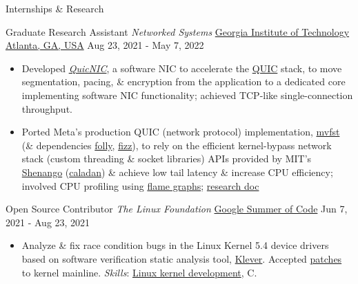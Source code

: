 \documentclass[]{mcdowellcv}
\begin{document}
\begin{cvsection}{Internships \& Research}
  \begin{cvsubsection}
    {Graduate Research Assistant \linebreak \textit{Networked Systems}}
    {\href{https://scs.gatech.edu/}{Georgia Institute of Technology \linebreak Atlanta, GA, USA}}
    {Aug 23, 2021 - May 7, 2022}
    \begin{itemize}
      \item
            Developed
            \href{https://github.com/saubhik/caladan/pulls}{\textit{QuicNIC}},
            a software NIC to accelerate the \href{https://quicwg.org/}{QUIC}
            stack, to move segmentation, pacing, \& encryption from the
            application to a dedicated core implementing software NIC
            functionality; achieved TCP-like single-connection throughput.
      \item
            Ported Meta's production QUIC (network protocol) implementation,
            \href{https://github.com/facebookincubator/mvfst}{mvfst} (\&
            dependencies \href{https://github.com/facebook/folly}{folly},
            \href{https://github.com/facebookincubator/fizz}{fizz}), to rely on
            the efficient kernel-bypass network stack (custom threading \&
            socket libraries) APIs provided by MIT's
            \href{https://www.usenix.org/conference/nsdi19/presentation/ousterhout}{Shenango}
            (\href{https://github.com/shenango/caladan}{caladan}) \& achieve low
            tail latency \& increase CPU efficiency; involved CPU profiling
            using
            \href{https://www.brendangregg.com/FlameGraphs/cpuflamegraphs.html}{flame
              graphs};
            \href{https://drive.google.com/file/d/1-y7gsG67KGIeD2qhomVT0vTPlPB4Vep1/view?usp=sharing}{research
              doc}
    \end{itemize}
  \end{cvsubsection}

  \begin{cvsubsection}
    {Open Source Contributor \linebreak \textit{The Linux Foundation}}
    {\href{https://summerofcode.withgoogle.com/archive/2021/projects/4818588170452992}{Google Summer of Code}}
    {Jun 7, 2021 - Aug 23, 2021}
    \begin{itemize}
      \item
            Analyze \& fix race condition bugs in the Linux Kernel 5.4 device
            drivers based on software verification static analysis tool,
            \href{https://forge.ispras.ru/projects/klever}{Klever}. Accepted
            \href{https://lore.kernel.org/lkml/?q=saubhik}{patches} to kernel
            mainline. \textit{Skills}: \href{https://www.kernel.org/}{Linux
              kernel development}, C.
    \end{itemize}
  \end{cvsubsection}
\end{cvsection}
\end{document}
